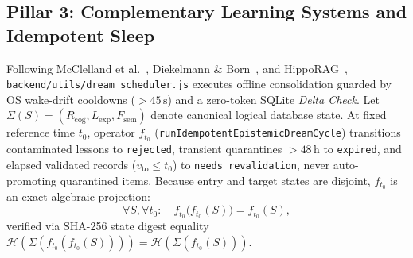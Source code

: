 \documentclass[10pt,twocolumn]{article}
\begin{document}
\subsection{Pillar 3: Complementary Learning Systems and Idempotent Sleep}
Following McClelland et al.~\cite{E09}, Diekelmann \& Born~\cite{E10}, and HippoRAG~\cite{E11}, \texttt{backend/utils/dream\_scheduler.js} executes offline consolidation guarded by OS wake-drift cooldowns ($>45\,\mathrm{s}$) and a zero-token SQLite \emph{Delta Check}. Let $\Sigma(S) = (R_{\mathrm{cog}}, L_{\mathrm{exp}}, F_{\mathrm{sem}})$ denote canonical logical database state. At fixed reference time $t_0$, operator $f_{t_0}$ (\texttt{runIdempotentEpistemicDreamCycle}) transitions contaminated lessons to \texttt{rejected}, transient quarantines $>48\,\mathrm{h}$ to \texttt{expired}, and elapsed validated records ($v_{\mathrm{to}} \le t_0$) to \texttt{needs\_revalidation}, never auto-promoting quarantined items. Because entry and target states are disjoint, $f_{t_0}$ is an exact algebraic projection:
\begin{equation}
\forall S, \forall t_0: \quad f_{t_0}\bigl(f_{t_0}(S)\bigr) = f_{t_0}(S),
\end{equation}
verified via SHA-256 state digest equality $\mathcal{H}(\Sigma(f_{t_0}(f_{t_0}(S)))) = \mathcal{H}(\Sigma(f_{t_0}(S)))$.
\end{document}
